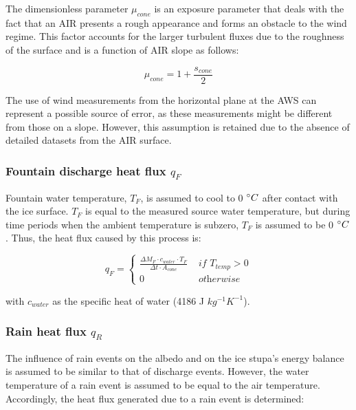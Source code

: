 The dimensionless parameter $\mu_{cone}$ is an exposure parameter that deals with the fact that an AIR presents a rough
appearance and forms an obstacle to the wind regime. This factor accounts for the larger turbulent fluxes due to
the roughness of the surface \citep{oerlemansBriefCommunicationGrowth2021} and is a function of AIR slope
as follows:

\begin{equation}
	\mu_{cone} = 1 + \frac{s_{cone}}{2}
	\label{eqn:mu}
\end{equation}

The use of wind measurements from the horizontal plane at the \ac{AWS} can represent a possible source of error,
as these measurements might be different from those on a slope. However, this assumption is retained due to the absence of detailed datasets from the AIR surface.

\subsubsection{Fountain discharge heat flux \texorpdfstring{$q_{F}$}{Lg} } \label{sec:heatflux}

Fountain water temperature, $T_F$, is assumed to cool to 0 $^{\circ} C$ after contact with the ice surface.
$T_F$ is equal to the measured source water temperature, but during time periods when the ambient temperature is
subzero, $T_F$ is assumed to be 0 $^{\circ} C$. Thus, the heat flux caused by this process is:

\begin{equation}
	q_{F} = \left\{ \begin{array}{ll}
		\frac{ \Delta M_F \cdot c_{water} \cdot T_F}{\Delta t \cdot A_{cone}} & \textit{ if } T_{temp} > 0 \\
		0                                                                     & \textit{ otherwise}
	\end{array} \right.
\end{equation}

with $c_{water}$ as the specific heat of water (4186 J $kg^{-1} K^{-1}$).

\subsubsection{Rain heat flux \texorpdfstring{$q_{R}$}{Lg} }

The influence of rain events on the albedo and on the ice stupa's energy balance is assumed to be similar to that of discharge
events. However, the water temperature of a rain event is assumed to be equal to the air temperature. Accordingly,
the heat flux generated due to a rain event is determined:

